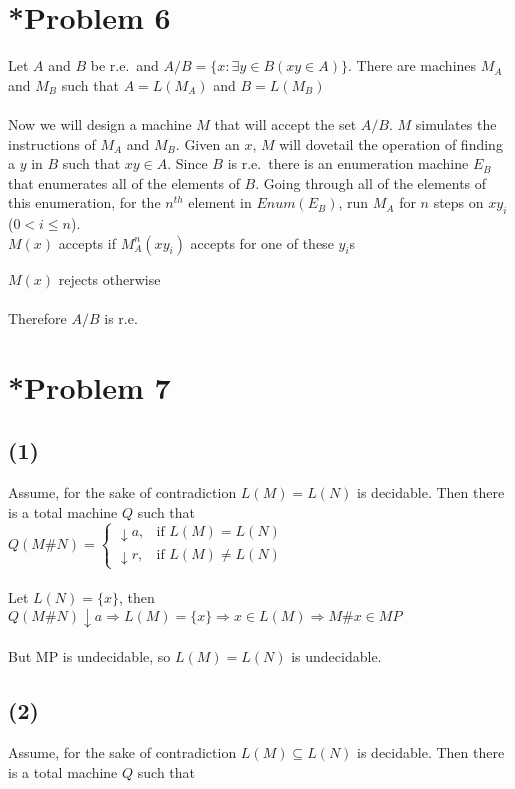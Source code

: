 \documentclass[12pt]{article}
\begin{document}
\section*{*Problem 6}
Let $A$ and $B$ be r.e.\ and
$A / B = \{x : \exists y \in B (xy \in A) \}$. There are machines $M_A$ and $M_B$
such that $A = L(M_A)$ and $B = L(M_B)$\\
\\
Now we will design a machine $M$ that will accept the set $A / B$. $M$ simulates
the instructions of $M_A$ and $M_B$. Given an $x$, $M$ will dovetail the operation
of finding a $y$ in $B$ such that $xy \in A$. Since $B$ is r.e.\ there is an
enumeration machine $E_B$ that enumerates all of the elements of $B$. Going
through all of the elements of this enumeration, for the $n^{th}$ element in
$Enum(E_B)$, run $M_A$ for $n$ steps on $xy_i$ ($0 < i \leq n$).\\

$M(x)$ accepts if $M_A^n(xy_i)$ accepts for one of these $y_i$s

$M(x)$ rejects otherwise\\
\\
Therefore $A / B$ is r.e. 

\section*{*Problem 7}
\subsection*{(1)}
Assume, for the sake of contradiction $L(M) = L(N)$ is decidable. Then there is a 
total machine $Q$ such that\\

$Q(M\#N) = \begin{cases}
            \downarrow a, & \mbox{if } L(M) = L(N)\\
            \downarrow r, & \mbox{if } L(M) \neq L(N)
          \end{cases}$\\
\\
Let $L(N) = \{x\}$, then\\

$Q(M\#N) \downarrow a \Rightarrow L(M) = \{x\} \Rightarrow x \in L(M) \Rightarrow M\#x \in MP$\\
\\
But MP is undecidable, so $L(M) = L(N)$ is undecidable.
  
\subsection*{(2)}
Assume, for the sake of contradiction $L(M) \subseteq L(N)$ is decidable. Then there
is a total machine $Q$ such that\\
\end{document}

